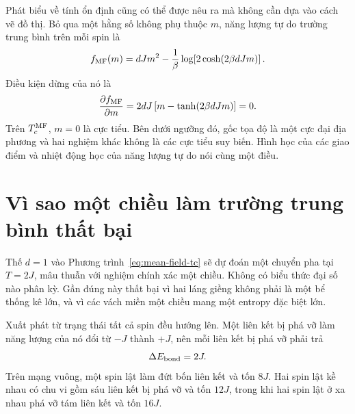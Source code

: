 Phát biểu về tính ổn định cũng có thể được nêu ra mà không cần dựa vào cách vẽ đồ thị. Bỏ qua một hằng số không phụ thuộc \(m\), năng lượng tự do trường trung bình trên mỗi spin là
\begin{equation}
f_{\rm MF}(m)
=dJm^2-\frac{1}{\beta}
\log\!\left[2\cosh(2\beta dJm)\right].
\label{eq:mf-free-energy}
\end{equation}
Điều kiện dừng của nó là
\begin{equation}
\frac{\partial f_{\rm MF}}{\partial m}
=2dJ\left[m-\tanh(2\beta dJm)\right]=0.
\end{equation}
Trên \(T_c^{\rm MF}\), \(m=0\) là cực tiểu. Bên dưới ngưỡng đó, gốc tọa độ là một cực đại địa phương và hai nghiệm khác không là các cực tiểu suy biến. Hình học của các giao điểm và nhiệt động học của năng lượng tự do nói cùng một điều.

\begin{classroomqa}
\end{classroomqa}

\section{Vì sao một chiều làm trường trung bình thất bại}

Thế \(d=1\) vào Phương trình~\eqref{eq:mean-field-tc} sẽ dự đoán một chuyển pha tại \(T=2J\), mâu thuẫn với nghiệm chính xác một chiều. Không có biểu thức đại số nào phân kỳ. Gần đúng này thất bại vì hai láng giềng không phải là một bể thống kê lớn, và vì các vách miền một chiều mang một entropy đặc biệt lớn.

Xuất phát từ trạng thái tất cả spin đều hướng lên. Một liên kết bị phá vỡ làm năng lượng của nó đổi từ \(-J\) thành \(+J\), nên mỗi liên kết bị phá vỡ phải trả
\begin{equation}
\Delta E_{\rm bond}=2J.
\end{equation}
Trên mạng vuông, một spin lật làm đứt bốn liên kết và tốn \(8J\). Hai spin lật kề nhau có chu vi gồm sáu liên kết bị phá vỡ và tốn \(12J\), trong khi hai spin lật ở xa nhau phá vỡ tám liên kết và tốn \(16J\).

